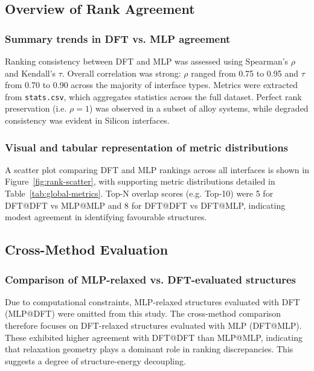 \subsection{Overview of Rank Agreement}

\subsubsection{Summary trends in DFT vs. MLP agreement}

Ranking consistency between DFT and MLP was assessed using Spearman's $\rho$ and Kendall's $\tau$. Overall correlation was strong: $\rho$ ranged from 0.75 to 0.95 and $\tau$ from 0.70 to 0.90 across the majority of interface types. Metrics were extracted from \texttt{stats.csv}, which aggregates statistics across the full dataset. Perfect rank preservation (i.e. $\rho = 1$) was observed in a subset of alloy systems, while degraded consistency was evident in Silicon interfaces.

\subsubsection{Visual and tabular representation of metric distributions}

A scatter plot comparing DFT and MLP rankings across all interfaces is shown in Figure~\ref{fig:rank-scatter}, with supporting metric distributions detailed in Table~\ref{tab:global-metrics}. Top-N overlap scores (e.g. Top-10) were 5 for DFT@DFT vs MLP@MLP and 8 for DFT@DFT vs DFT@MLP, indicating modest agreement in identifying favourable structures.

\subsection{Cross-Method Evaluation}

\subsubsection{Comparison of MLP-relaxed vs. DFT-evaluated structures}

Due to computational constraints, MLP-relaxed structures evaluated with DFT (MLP@DFT) were omitted from this study. The cross-method comparison therefore focuses on DFT-relaxed structures evaluated with MLP (DFT@MLP). These exhibited higher agreement with DFT@DFT than MLP@MLP, indicating that relaxation geometry plays a dominant role in ranking discrepancies. This suggests a degree of structure-energy decoupling.

